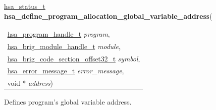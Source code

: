 \documentclass[final]{book}
\newcommand{\hsaarg}[1]{\textit{#1}}
\begin{document}
\begin{appendices}
\noindent\begin{tcolorbox}[breakable,nobeforeafter,colframe=white,colback=lightgray,left=0mm]
\hyperlink{group--status-1gad755322e7ff95456520e8abdbe90d225}{hsa_status_t} \hypertarget{group--HsailLinkerServiceLayer-1ga66996b48be9dd0f2ce58416562b1d520}{\textbf{hsa_define_program_allocation_global_variable_address}}(
\vspace{-3.5mm}\begin{longtable}{@{}p{\textwidth}}
\hspace{1.7em}\hyperlink{group--HsailLinkerServiceLayer-1ga7b28ca39da981be49aac99608eb386cb}{hsa_program_handle_t} \hsaarg{program},\\
\hspace{1.7em}\hyperlink{group--FinalizerCoreApi-1gafaea8b9ab368c499b58375f02f4b178b}{hsa_brig_module_handle_t} \hsaarg{module},\\
\hspace{1.7em}\hyperlink{group--FinalizerCoreApi-1ga975ce5cee53438ed8dc078f3e1dfbc04}{hsa_brig_code_section_offset32_t} \hsaarg{symbol},\\
\hspace{1.7em}\hyperlink{group--FinalizerCoreApi-1ga0105dcb4254850e0ec03d44fc54e11b8}{hsa_error_message_t} \hsaarg{error_message},\\
\hspace{1.7em}void * \hsaarg{address})\end{longtable}

\end{tcolorbox}
Defines program's global variable address.


\end{appendices}
\end{document}
